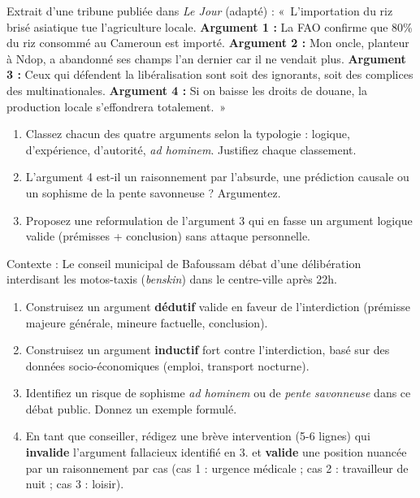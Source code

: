\documentclass[11pt]{article}
\begin{document}
\begin{exercice}
Extrait d'une tribune publiée dans \textit{Le Jour} (adapté) : 
«~L'importation du riz brisé asiatique tue l'agriculture locale. \textbf{Argument 1 :} La FAO confirme que 80\% du riz consommé au Cameroun est importé. \textbf{Argument 2 :} Mon oncle, planteur à Ndop, a abandonné ses champs l'an dernier car il ne vendait plus. \textbf{Argument 3 :} Ceux qui défendent la libéralisation sont soit des ignorants, soit des complices des multinationales. \textbf{Argument 4 :} Si on baisse les droits de douane, la production locale s'effondrera totalement.~»
\begin{enumerate}
    \item Classez chacun des quatre arguments selon la typologie : logique, d'expérience, d'autorité, \textit{ad hominem}. Justifiez chaque classement.
    \item L'argument 4 est-il un raisonnement par l'absurde, une prédiction causale ou un sophisme de la pente savonneuse ? Argumentez.
    \item Proposez une reformulation de l'argument 3 qui en fasse un argument logique valide (prémisses + conclusion) sans attaque personnelle.
\end{enumerate}
\end{exercice}

\begin{exercice}
Contexte : Le conseil municipal de Bafoussam débat d'une délibération interdisant les motos-taxis (\textit{benskin}) dans le centre-ville après 22h.
\begin{enumerate}
    \item Construisez un argument \textbf{dédutif} valide en faveur de l'interdiction (prémisse majeure générale, mineure factuelle, conclusion).
    \item Construisez un argument \textbf{inductif} fort contre l'interdiction, basé sur des données socio-économiques (emploi, transport nocturne).
    \item Identifiez un risque de sophisme \textit{ad hominem} ou de \textit{pente savonneuse} dans ce débat public. Donnez un exemple formulé.
    \item En tant que conseiller, rédigez une brève intervention (5-6 lignes) qui \textbf{invalide} l'argument fallacieux identifié en 3. et \textbf{valide} une position nuancée par un raisonnement par cas (cas 1 : urgence médicale ; cas 2 : travailleur de nuit ; cas 3 : loisir).
\end{enumerate}
\end{exercice}
\end{document}
